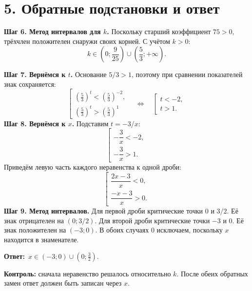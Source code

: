 \documentclass[a4paper,12pt]{article}
\newcommand{\idea}[1]{\textcolor{darkaccent}{\textbf{#1}}}
\newcommand{\ans}[1]{\textcolor{darkaccent}{\textbf{Ответ:}}\ #1}
\newcommand{\sect}[1]{\section*{\color{darkaccent}#1}}
\begin{document}
\sect{5. Обратные подстановки и ответ}
\textbf{Шаг 6. Метод интервалов для $k$.} Поскольку старший коэффициент $75>0$, трёхчлен положителен снаружи своих корней. С учётом $k>0$:
\[
 k\in\left(0;\frac9{25}\right)\cup\left(\frac53;+\infty\right).
\]
\begin{center}
\end{center}
\textbf{Шаг 7. Вернёмся к $t$.} Основание $5/3>1$, поэтому при сравнении показателей знак сохраняется:
\[
\left[\begin{gathered}
\left(\frac53\right)^t<\left(\frac53\right)^{-2},\\
\left(\frac53\right)^t>\left(\frac53\right)^1
\end{gathered}\right.
\quad\Longleftrightarrow\quad
\left[\begin{gathered}t<-2,\\t>1.\end{gathered}\right.
\]
\textbf{Шаг 8. Вернёмся к $x$.} Подставим $t=-3/x$:
\[
\left[\begin{gathered}-\dfrac3x<-2,\\[4pt]-\dfrac3x>1.\end{gathered}\right.
\]
Приведём левую часть каждого неравенства к одной дроби:
\[
\left[\begin{gathered}\dfrac{2x-3}{x}<0,\\[7pt]\dfrac{-x-3}{x}>0.\end{gathered}\right.
\]
\textbf{Шаг 9. Метод интервалов.}
Для первой дроби критические точки $0$ и $3/2$. Её знак отрицателен на $(0;3/2)$.
Для второй дроби критические точки $-3$ и $0$. Её знак положителен на $(-3;0)$.
В обоих случаях $0$ исключаем, поскольку $x$ находится в знаменателе.

\ans{$\displaystyle x\in(-3;0)\cup\left(0;\frac32\right).$}

\vspace{2mm}
\idea{Контроль:} сначала неравенство решалось относительно $k$. После обеих обратных замен ответ должен быть записан через $x$.
\clearpage
\end{document}
